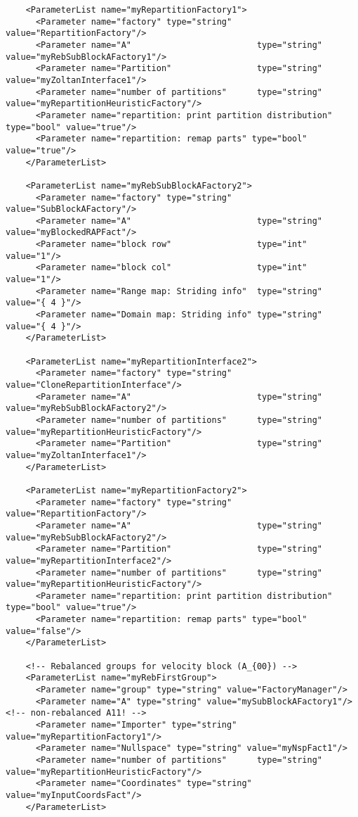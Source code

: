 \documentclass[10pt,fleqn]{book}
\begin{document}
\begin{lstlisting}
    <ParameterList name="myRepartitionFactory1">
      <Parameter name="factory" type="string" value="RepartitionFactory"/>
      <Parameter name="A"                         type="string"  value="myRebSubBlockAFactory1"/>
      <Parameter name="Partition"                 type="string"  value="myZoltanInterface1"/>
      <Parameter name="number of partitions"      type="string"  value="myRepartitionHeuristicFactory"/>
      <Parameter name="repartition: print partition distribution" type="bool" value="true"/>
      <Parameter name="repartition: remap parts" type="bool" value="true"/>
    </ParameterList>    
      
    <ParameterList name="myRebSubBlockAFactory2">
      <Parameter name="factory" type="string" value="SubBlockAFactory"/>
      <Parameter name="A"                         type="string"  value="myBlockedRAPFact"/>
      <Parameter name="block row"                 type="int"     value="1"/>
      <Parameter name="block col"                 type="int"     value="1"/>
      <Parameter name="Range map: Striding info"  type="string"  value="{ 4 }"/>
      <Parameter name="Domain map: Striding info" type="string"  value="{ 4 }"/>
    </ParameterList>
   
    <ParameterList name="myRepartitionInterface2">
      <Parameter name="factory" type="string" value="CloneRepartitionInterface"/>
      <Parameter name="A"                         type="string"  value="myRebSubBlockAFactory2"/>
      <Parameter name="number of partitions"      type="string"  value="myRepartitionHeuristicFactory"/>
      <Parameter name="Partition"                 type="string"  value="myZoltanInterface1"/>
    </ParameterList>
    
    <ParameterList name="myRepartitionFactory2">
      <Parameter name="factory" type="string" value="RepartitionFactory"/>
      <Parameter name="A"                         type="string"  value="myRebSubBlockAFactory2"/>
      <Parameter name="Partition"                 type="string"  value="myRepartitionInterface2"/>
      <Parameter name="number of partitions"      type="string"  value="myRepartitionHeuristicFactory"/>
      <Parameter name="repartition: print partition distribution" type="bool" value="true"/>
      <Parameter name="repartition: remap parts" type="bool" value="false"/>
    </ParameterList>   
    
    <!-- Rebalanced groups for velocity block (A_{00}) -->
    <ParameterList name="myRebFirstGroup">
      <Parameter name="group" type="string" value="FactoryManager"/>
      <Parameter name="A" type="string" value="mySubBlockAFactory1"/> <!-- non-rebalanced A11! -->
      <Parameter name="Importer" type="string" value="myRepartitionFactory1"/>
      <Parameter name="Nullspace" type="string" value="myNspFact1"/>
      <Parameter name="number of partitions"      type="string"  value="myRepartitionHeuristicFactory"/>
      <Parameter name="Coordinates" type="string" value="myInputCoordsFact"/>
    </ParameterList>


\end{lstlisting}
\end{document}
